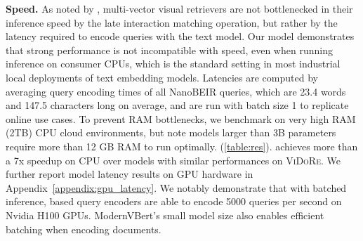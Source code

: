 
\noindent\textbf{Speed.} As noted by , multi-vector visual retrievers are not bottlenecked in their inference speed by the late interaction matching operation, but rather by the latency required to encode queries with the text model. Our model demonstrates that strong performance is not incompatible with speed, even when running inference on consumer CPUs, which is the standard setting in most industrial local deployments of text embedding models. Latencies are computed by averaging query encoding times of all NanoBEIR queries, which are 23.4 words and 147.5 characters long on average, and are run with batch size 1 to replicate online use cases. To prevent RAM bottlenecks, we benchmark on very high RAM (2TB) CPU cloud environments, but note models larger than 3B parameters require more than 12 GB RAM to run optimally.  (\autoref{table:res}). \flagship{} achieves more than a 7x speedup on CPU over models with similar performances on \textsc{ViDoRe}. We further report model latency results on GPU hardware in Appendix~\ref{appendix:gpu_latency}. We notably demonstrate that with batched inference, \flagship{} based query encoders are able to encode 5000 queries per second on Nvidia H100 GPUs. ModernVBert's small model size also enables efficient batching when encoding documents.



